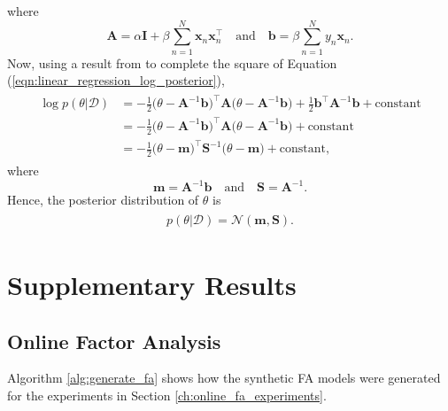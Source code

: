 \documentclass[msc,deptreport.inf]{infthesis} %
\newcommand{\matr}[1]{\mathbf{#1}}
\begin{document}
where 
\begin{equation}
	\matr{A} = \alpha \matr{I} + \beta \sum_{n=1}^N \matr{x}_n \matr{x}_n^\intercal
	\quad \text{and} \quad 
	\matr{b} = \beta \sum_{n=1}^N y_n \matr{x}_n.
\end{equation}
Now, using a result from \cite{barber2007} to complete the square of Equation (\ref{eqn:linear_regression_log_posterior}),
\begin{align}
\begin{split}
	\log p(\theta | \mathcal{D}) 
	& = -\frac{1}{2} \big(\theta - \matr{A}^{-1} \matr{b} \big)^\intercal \matr{A} \big(\theta - \matr{A}^{-1} \matr{b} \big)
	+ \frac{1}{2} \matr{b}^\intercal \matr{A}^{-1} \matr{b}
	+ \text{constant} \\
	& = -\frac{1}{2} \big(\theta - \matr{A}^{-1} \matr{b} \big)^\intercal \matr{A} \big(\theta - \matr{A}^{-1} \matr{b} \big)
	+ \text{constant} \\
	& = -\frac{1}{2} \big(\theta - \matr{m} \big)^\intercal \matr{S}^{-1} \big(\theta - \matr{m} \big)
	+ \text{constant},
\end{split}
\end{align}
where
\begin{equation}
	\matr{m} = \matr{A}^{-1} \matr{b}
	\quad \text{and} \quad 
	\matr{S} = \matr{A}^{-1}.
\end{equation}
Hence, the posterior distribution of $\theta$ is 
\begin{align}
\begin{split}
	p(\theta | \mathcal{D}) = \mathcal{N}(\matr{m}, \matr{S}).
\end{split}
\end{align}


 \chapter{Supplementary Results}
 
 \section{Online Factor Analysis}\label{app:online_fa}
 
Algorithm \ref{alg:generate_fa} shows how the synthetic FA models were generated for the experiments in Section \ref{ch:online_fa_experiments}.
 
\end{document}
